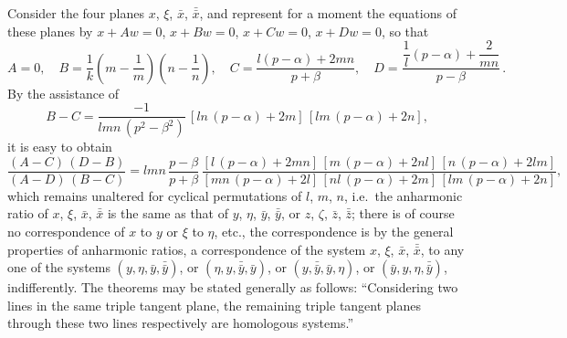 \documentclass[12pt,a4paper]{article}
\begin{document}
Consider the four planes $x$, $\xi$, $\bar{x}$, $\bar{\bar{x}}$, and represent for a moment the equations of these planes by $x + Aw = 0$, $x + Bw = 0$, $x + Cw = 0$, $x + Dw = 0$, so that
\[
A = 0, \quad B = \frac{1}{k}\left(m - \frac{1}{m}\right)\left(n - \frac{1}{n}\right), \quad C = \frac{l(p - \alpha) + 2mn}{p + \beta}, \quad D = \frac{\dfrac{1}{l}(p - \alpha) + \dfrac{2}{mn}}{p - \beta}\,.
\]
By the assistance of
\[
B - C = \frac{-1}{lmn\,(p^2 - \beta^2)}\,[ln\,(p - \alpha) + 2m]\,[lm\,(p - \alpha) + 2n],
\]
it is easy to obtain
\[
\frac{(A - C)\,(D - B)}{(A - D)\,(B - C)} = lmn\,\frac{p - \beta}{p + \beta}\,
\frac{[l\,(p - \alpha) + 2mn]\,[m\,(p - \alpha) + 2nl]\,[n\,(p - \alpha) + 2lm]}
{[mn\,(p - \alpha) + 2l]\,[nl\,(p - \alpha) + 2m]\,[lm\,(p - \alpha) + 2n]},
\]
which remains unaltered for cyclical permutations of $l$, $m$, $n$, i.e.\ the anharmonic ratio of $x$, $\xi$, $\bar{x}$, $\bar{\bar{x}}$ is the same as that of $y$, $\eta$, $\bar{y}$, $\bar{\bar{y}}$, or $z$, $\zeta$, $\bar{z}$, $\bar{\bar{z}}$; there is of course no correspondence of $x$ to $y$ or $\xi$ to $\eta$, etc., the correspondence is by the general properties of anharmonic ratios, a correspondence of the system $x$, $\xi$, $\bar{x}$, $\bar{\bar{x}}$, to any one of the systems $(y, \eta, \bar{y}, \bar{\bar{y}})$, or $(\eta, y, \bar{\bar{y}}, \bar{y})$, or $(y, \bar{\bar{y}}, \bar{y}, \eta)$, or $(\bar{y}, y, \eta, \bar{\bar{y}})$, indifferently. The theorems may be stated generally as follows: ``Considering two lines in the same triple tangent plane, the remaining triple tangent planes through these two lines respectively are homologous systems.''
\end{document}
